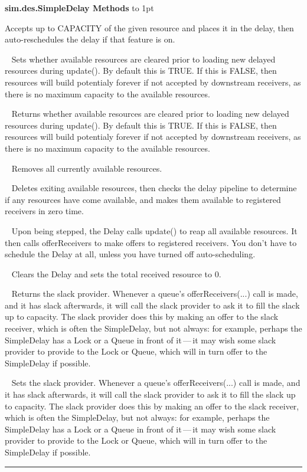 \documentclass[twoside,10pt]{article}
\newcommand\class[1]{\index{Classes!{#1}}\textsf{#1}}
\newcommand*{\xfill}[1][0pt]{%
	\cleaders
		\hbox to 1pt{\hss
			\raisebox{#1}{\rule{1.2pt}{0.4pt}}%
			\hss}\hfill}
\newenvironment{methods}[1]{
\vspace{1.0em}\noindent\textsf{\textbf{#1 Methods}}\quad \xfill[0.5ex]
\vspace{-0.25em}
\begin{description}
\small}
{\end{description}\hrule\vspace{1.5em}}
\newcommand{\mthd}[1]{\item[{\sf #1}]~\newline}
\begin{document}
\begin{methods}{\class{sim.des.SimpleDelay}}
Accepts up to CAPACITY of the given resource and places it in the delay,
        then auto-reschedules the delay if that feature is on. 
\mthd{public void setDropsResourcesBeforeUpdate(boolean val)}
     Sets whether available resources are cleared prior to loading new delayed resources
        during update().  By default this is TRUE.  If this is FALSE, then resources will build
        potentialy forever if not accepted by downstream receivers, as there is no maximum 
        capacity to the available resources.   
\mthd{public boolean getDropsResourcesBeforeUpdate()}
Returns whether available resources are cleared prior to loading new delayed resources
        during update().  By default this is TRUE.  If this is FALSE, then resources will build
        potentialy forever if not accepted by downstream receivers, as there is no maximum 
        capacity to the available resources. 
\mthd{protected void drop()}
Removes all currently available resources. 
\mthd{protected void update()}
Deletes exiting available resources, then 
        checks the delay pipeline to determine if any resources have come available, and makes
        them available to registered receivers in zero time. 
\mthd{public void step(SimState state)}
Upon being stepped, the Delay calls update() to reap all available resources.  It then
        calls offerReceivers to make offers to registered receivers.  You don't have to
        schedule the Delay at all, unless you have turned off auto-scheduling. 
\mthd{public void reset()}
 Clears the Delay and sets the total received resource to 0.
\mthd{public Provider getSlackProvider()}
Returns the slack provider.  Whenever a queue's offerReceivers(...) call is made, and it has slack afterwards,
    	it will call the slack provider to ask it to fill the slack up to capacity.  The slack provider does this by making an offer to the slack receiver, which is often the SimpleDelay,
    	but not always: for example, perhaps the SimpleDelay has a Lock or a Queue in front of it\,---\,it may wish some
    	slack provider to provide to the Lock or Queue, which will in turn offer to the SimpleDelay if possible.
\mthd{public void setSlackProvider(Provider provider)}
         Sets the slack provider.  Whenever a queue's offerReceivers(...) call is made, and it has slack afterwards,
    	it will call the slack provider to ask it to fill the slack up to capacity.  The slack provider does this by making an offer to the slack receiver, which is often the SimpleDelay,
    	but not always: for example, perhaps the SimpleDelay has a Lock or a Queue in front of it\,---\,it may wish some
    	slack provider to provide to the Lock or Queue, which will in turn offer to the SimpleDelay if possible.


\end{methods}
\end{document}
